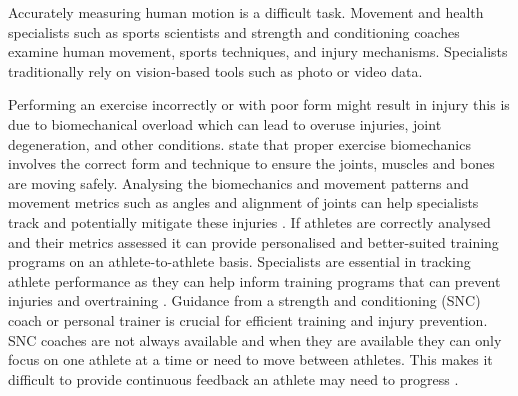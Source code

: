 \renewcommand{\labelenumii}{\arabic{enumi}.\arabic{enumii}}
\renewcommand{\labelenumiii}{\arabic{enumi}.\arabic{enumii}.\arabic{enumiii}}
\renewcommand{\labelenumiv}{\arabic{enumi}.\arabic{enumii}.\arabic{enumiii}.\arabic{enumiv}}

\label{chap:introduction}

\label{sec:background}


Accurately measuring human motion is a difficult task. Movement and health specialists such as sports scientists and strength and conditioning coaches examine human movement, sports techniques, and injury mechanisms. Specialists traditionally rely on vision-based tools such as photo or video data.


Performing an exercise incorrectly or with poor form might result in injury \cite{Chariar2023} this is due to biomechanical overload which can lead to overuse injuries, joint degeneration, and other conditions. \citet{Forte2023} state that proper exercise biomechanics involves the correct form and technique to ensure the joints, muscles and bones are moving safely.
Analysing the biomechanics and movement patterns and movement metrics such as angles and alignment of joints can help specialists track and potentially mitigate these injuries \cite{Forte2023}.
If athletes are correctly analysed and their metrics assessed it can provide personalised and better-suited training programs on an athlete-to-athlete basis.
Specialists are essential in tracking athlete performance as they can help inform training programs that can prevent injuries and overtraining \cite{Mileva2022}. %
Guidance from a strength and conditioning (SNC) coach or personal trainer is crucial for efficient training and injury prevention. SNC coaches are not always available and when they are available they can only focus on one athlete at a time or need to move between athletes. This makes it difficult to provide continuous feedback an athlete may need to progress \cite{Needham2021}.

